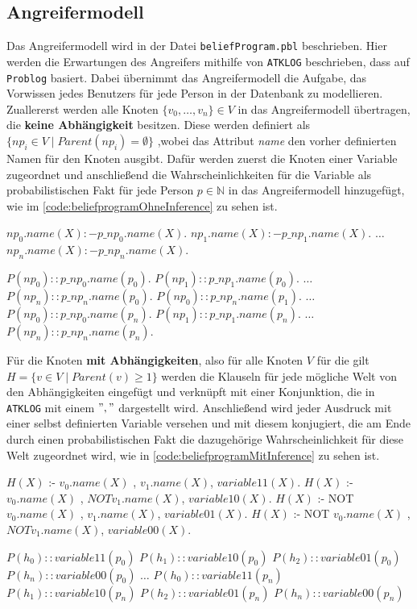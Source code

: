\documentclass[german,version-2020-11]{uzl-thesis}
\begin{document}
\subsection{Angreifermodell} \label{2.2.1}
Das Angreifermodell wird in der Datei \texttt{beliefProgram.pbl} beschrieben. Hier werden die Erwartungen des Angreifers mithilfe von \texttt{ATKLOG} beschrieben, dass auf \texttt{Problog} basiert. Dabei übernimmt das Angreifermodell die Aufgabe, das Vorwissen jedes Benutzers für jede Person in der Datenbank zu modellieren. \\ 
Zuallererst werden alle Knoten $\{v_0, \dots ,v_n\} \in V$ in das Angreifermodell übertragen, die \textbf{keine Abhängigkeit} besitzen. Diese werden definiert als $\{np_i \in V \mid Parent(np_i) = \emptyset\}$ ,wobei das Attribut \textit{name} den vorher definierten Namen für den Knoten ausgibt. Dafür werden zuerst die Knoten einer Variable zugeordnet und anschließend die Wahrscheinlichkeiten für die Variable als probabilistischen Fakt für jede Person $p \in \mathbb{N}$ in das Angreifermodell hinzugefügt, wie im \autoref{code:beliefprogramOhneInference} zu sehen ist.
\begin{Pseudocode} [caption={\texttt{beliefProgram.pbl} für Knoten ohne Abhängigkeiten}, label={code:beliefprogramOhneInference}]
$np_0.name(X) :- p\_np_0.name(X).$ 
$np_1.name(X) :- p\_np_1.name(X).$ 
$\dots$
$np_n.name(X) :- p\_np_n.name(X).$

$P(np_0) ::  p\_np_0.name(p_0).$ 
$P(np_1) ::  p\_np_1.name(p_0).$ 
$\dots$
$P(np_n) ::  p\_np_n.name(p_0).$ 
$P(np_0) ::  p\_np_n.name(p_1).$ 
$\dots$
$P(np_0) ::  p\_np_0.name(p_n).$ 
$P(np_1) ::  p\_np_1.name(p_n).$ 
$\dots$
$P(np_n) ::  p\_np_n.name(p_n).$ 
\end{Pseudocode}
Für die Knoten \textbf{mit Abhängigkeiten}, also für alle Knoten $V$ für die gilt $H=\{v \in V \mid Parent(v) \geq 1 \}$ werden die Klauseln für jede mögliche Welt von den Abhängigkeiten eingefügt und verknüpft mit einer Konjunktion, die in \texttt{ATKLOG} mit einem $","$ dargestellt wird. Anschließend wird jeder Ausdruck mit einer selbst definierten Variable versehen und mit diesem konjugiert, die am Ende durch einen probabilistischen Fakt die dazugehörige Wahrscheinlichkeit für diese Welt zugeordnet wird, wie in \autoref{code:beliefprogramMitInference} zu sehen ist.
\begin{Pseudocode}[caption={\texttt{beliefProgram.pbl} für Knoten mit Abhängigkeiten}, label={code:beliefprogramMitInference}]
$H(X)$ :- $v_0.name(X)$ , $v_1.name(X)$, $variable11(X).$
$H(X)$ :- $v_0.name(X)$ , $NOT v_1.name(X)$, $variable10(X).$
$H(X)$ :- NOT $v_0.name(X)$ , $v_1.name(X)$, $variable01(X).$
$H(X)$ :- NOT $v_0.name(X)$ , $NOT v_1.name(X)$, $variable00(X).$

$P(h_0) :: variable11(p_0)$
$P(h_1) :: variable10(p_0)$
$P(h_2) :: variable01(p_0)$
$P(h_n) :: variable00(p_0)$
$\dots$
$P(h_0) :: variable11(p_n)$
$P(h_1) :: variable10(p_n)$
$P(h_2) :: variable01(p_n)$
$P(h_n) :: variable00(p_n)$
\end{Pseudocode} 
\end{document}
